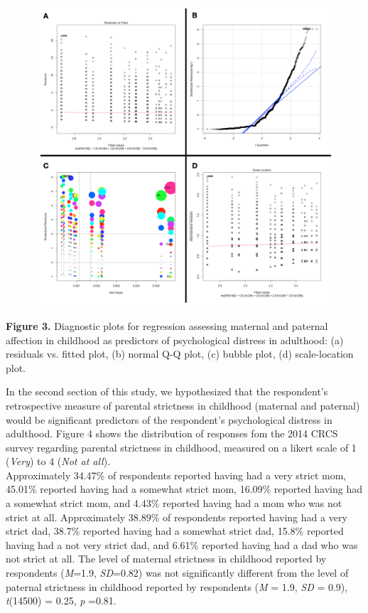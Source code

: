 \documentclass[12pt,letterpaper]{article}
\begin{document}
\begin{figure}[H]
	\centering
	\includegraphics[scale=0.4]{reg1_asps.png}
\end{figure}	

\begin{center}
	\singlespacing
	\textbf{Figure 3.} Diagnostic plots for regression assessing  maternal and paternal affection in childhood as predictors of psychological distress in adulthood: (a) residuals vs. fitted plot, (b) normal Q-Q plot, (c) bubble plot, (d) scale-location plot.
\end{center}


In the second section of this study, we hypothesized that the respondent's retrospective measure of parental strictness in childhood (maternal and paternal) would be significant predictors of the respondent's psychological distress in adulthood. Figure 4 shows the distribution of responses fom the 2014 CRCS survey regarding parental strictness in childhood, measured on a likert scale of 1 (\textit {Very}) to 4 (\textit{Not at all}). \\
\indent Approximately 34.47\% of respondents reported having had a very strict mom,  45.01\% reported having had a somewhat strict mom, 16.09\% reported having had a somewhat strict mom, and 4.43\% reported having had a mom who was not strict at all. Approximately 38.89\% of respondents reported having had a very strict dad,  38.7\% reported having had a somewhat strict dad, 15.8\% reported having had a not very strict dad, and 6.61\% reported having had a dad who was not strict at all. The level of maternal strictness in childhood reported by respondents (\textit{M}=1.9, \textit{SD}=0.82) was not significantly different from the level of paternal strictness in childhood reported by respondents (\textit{M} = 1.9, \textit{SD} = 0.9), \textit{t}(14500) = 0.25, \textit{p} =0.81.
\end{document}

